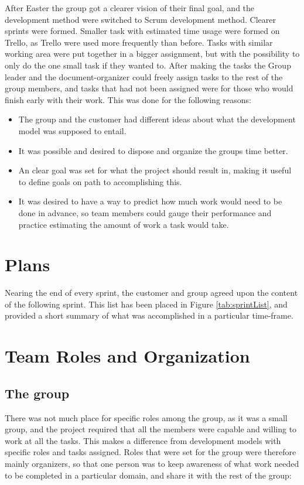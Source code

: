 After Easter the group got a clearer vision of their final goal, and the development method were switched to Scrum development method. Clearer sprints were formed. Smaller task with estimated time usage were formed on Trello, as Trello were used more frequently than before. Tasks with similar working area were put together in a bigger assignment, but with the possibility to only do the one small task if they wanted to. After making the tasks the Group leader and the document-organizer could freely assign tasks to the rest of the group members, and tasks that had not been assigned were for those who would finish early with their work. This was done for the following reasons:
\begin{itemize}
\item The group and the customer had different ideas about what the development model was supposed to entail.
\item It was possible and desired to dispose and organize the groups time better.
\item An clear goal was set for what the project should result in, making it useful to define goals on path to accomplishing this.
\item It was desired to have a way to predict how much work would need to be done in advance, so team members could gauge their performance and practice estimating the amount of work a task would take. 
\end{itemize}


\section{Plans}

Nearing the end of every sprint, the customer and group agreed upon the content of the following sprint. This list has been placed in Figure \ref{tab:sprintList}, and provided a short summary of what was accomplished in a particular time-frame. 


\section{Team Roles and Organization}
\subsection{The group}
There was not much place for specific roles among the group, as it was a small group, and the project required that all the members were capable and willing to work at all the tasks. This makes a difference from development models with specific roles and tasks assigned. Roles that were set for the group were therefore mainly organizers, so that one person was to keep awareness of what work needed to be completed in a particular domain, and share it with the rest of the group:

